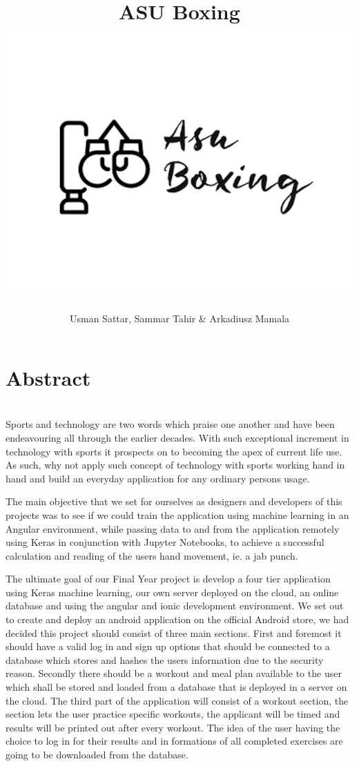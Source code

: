 \documentclass[a4paper,12pt]{report}
\begin{document}
\title{ASU Boxing \\ \includegraphics[width=0.5\columnwidth]{images/logo.png}}
\author{Usman Sattar, Sammar Tahir \& Arkadiusz Mamala}

\maketitle
\preface
\section*{Abstract}
\\
Sports and technology are two words which praise one another and have been endeavouring all through the earlier decades. With such exceptional increment in technology with sports it prospects on to becoming the apex of current life use. As such, why not apply such concept of technology with sports working hand in hand and build an everyday application for any ordinary persons usage.

The main objective that we set for ourselves as designers and developers of this projects was to see if we could train the application using machine learning in an Angular environment, while passing 
data to and from the application remotely using Keras in conjunction with Jupyter Notebooks, to achieve a successful calculation and reading of the users hand movement, ie. a jab punch.

The ultimate goal of our Final Year project is develop a four tier application using Keras machine learning, our own server deployed on the cloud, an online database and using the angular and ionic development environment.
We set out to create and deploy an android application on the official Android store, we had decided this project should consist of three main sections. 
First and foremost it should have a valid log in and sign up options that should be connected to a database which stores and hashes the users information due to the security reason. 
Secondly there should be a workout and meal plan available to the user which shall be stored and loaded from a database that is deployed in a server on the cloud.
The third part of the application will consist of a workout section, the section lets the user practice specific workouts, the applicant will be timed and results will be printed out after every workout. 
The idea of the user having the choice to log in for their results and in formations of all completed exercises are going to be downloaded from the database.
\end{document}
